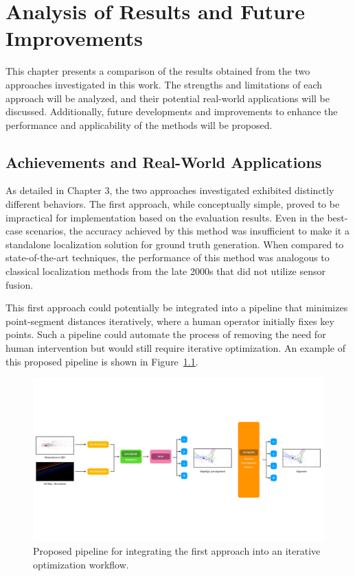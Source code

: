 \NoBgThispage
\chapter{Analysis of Results and Future Improvements}

This chapter presents a comparison of the results obtained from the two approaches investigated in this work. The strengths and limitations of each approach will be analyzed, and their potential real-world applications will be discussed. Additionally, future developments and improvements to enhance the performance and applicability of the methods will be proposed.

\section{Achievements and Real-World Applications}

As detailed in Chapter 3, the two approaches investigated exhibited distinctly different behaviors. The first approach, while conceptually simple, proved to be impractical for implementation based on the evaluation results. Even in the best-case scenarios, the accuracy achieved by this method was insufficient to make it a standalone localization solution for ground truth generation. When compared to state-of-the-art techniques, the performance of this method was analogous to classical localization methods from the late 2000s that did not utilize sensor fusion.

This first approach could potentially be integrated into a pipeline that minimizes point-segment distances iteratively, where a human operator initially fixes key points. Such a pipeline could automate the process of removing the need for human intervention but would still require iterative optimization. An example of this proposed pipeline is shown in Figure~\ref{fig:mapalign_optimizer}.

\begin{figure}[H]
    \centering
    \includegraphics[width=1\linewidth]{LateX//figs/mapalign_optimizer.pdf}
    \caption{Proposed pipeline for integrating the first approach into an iterative optimization workflow.}
    \label{fig:mapalign_optimizer}
\end{figure}

